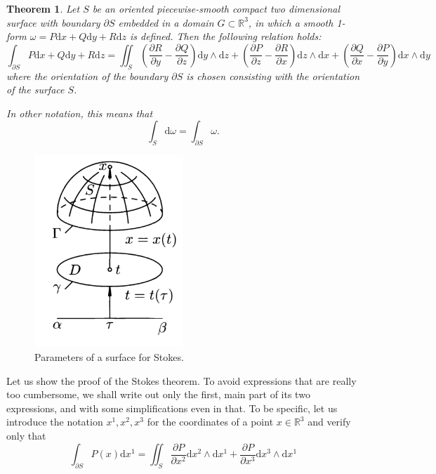 \documentclass[a4paper,12pt]{article}
\newtheorem{theorem}{Theorem}[section]  %
\begin{document}
\begin{CJK}{UTF8}{gbsn}
\begin{theorem}
    Let $S$ be an oriented piecewise-smooth compact two dimensional 
    surface with boundary $\partial S$ embedded in a domain $G \subset \mathbb{R}^3$,
    in which a smooth 1-form $\omega = P\mathrm{d}x + Q\mathrm{d}y +
    R\mathrm{d}z$ is defined. Then the following relation holds:
    \[
        \int_{\partial S}P\mathrm{d}x + Q\mathrm{d}y + R\mathrm{d}z
        = \iint_{S} \left(\frac{\partial R}{\partial y} 
        - \frac{\partial Q}{\partial z}\right)\mathrm{d}y \wedge \mathrm{d}z
        +\left(\frac{\partial P}{\partial z} - \frac{\partial R}{\partial x}\right)
        \mathrm{d}z \wedge \mathrm{d}x 
        + \left(\frac{\partial Q}{\partial x} - \frac{\partial P}{\partial y}\right)\mathrm{d}x \wedge \mathrm{d}y
    \]
    where the orientation of the boundary $\partial S$ is chosen consisting 
    with the orientation of the surface $S$.

    In other notation, this means that 
    \[
        \int_{S} \mathrm{d}\omega = \int_{\partial S} \omega.
    \]
\end{theorem}

\begin{figure}[htbp]
    \centering
    \includegraphics[width=0.5\textwidth]{stokes.png}
    \caption{Parameters of a surface for Stokes.}
    \label{fig:fig11}
\end{figure}
Let us show the proof of the Stokes theorem. To avoid expressions 
that are really too cumbersome, we shall write out only the first,
main part of its two expressions, and with some simplifications 
even in that. To be specific, let us introduce the notation 
$x^1, x^2, x^3$ for the coordinates of a point $x \in \mathbb{R}^3$
and verify only that 
\[
    \int_{\partial S} P(x)\mathrm{d}x^1 = \iint_S \frac{\partial P}{\partial x^2}\mathrm{d}x^2\wedge\mathrm{d}x^1
     + \frac{\partial P}{\partial x^3} \mathrm{d}x^3\wedge\mathrm{d}x^1
     \]


\end{CJK}
\end{document}
